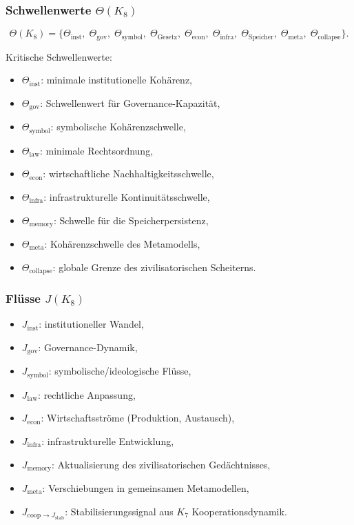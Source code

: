 \subsubsection{Schwellenwerte \texorpdfstring{$\Theta(K_8)$}{\Theta(K_8)}}

\[
\Theta(K_8)=
\{
\Theta_{\mathrm{inst}},\;
\Theta_{\mathrm{gov}},\;
\Theta_{\mathrm{symbol}},\;
\Theta_{\mathrm{Gesetz}},\;
\Theta_{\mathrm{econ}},\;
\Theta_{\mathrm{infra}},\;
\Theta_{\mathrm{Speicher}},\;
\Theta_{\mathrm{meta}},\;
\Theta_{\mathrm{collapse}}
\}.
\]

Kritische Schwellenwerte:
\begin{itemize}
    \item $\Theta_{\mathrm{inst}}$: minimale institutionelle Kohärenz,
    \item $\Theta_{\mathrm{gov}}$: Schwellenwert für Governance-Kapazität,
    \item $\Theta_{\mathrm{symbol}}$: symbolische Kohärenzschwelle,
    \item $\Theta_{\mathrm{law}}$: minimale Rechtsordnung,
    \item $\Theta_{\mathrm{econ}}$: wirtschaftliche Nachhaltigkeitsschwelle,
    \item $\Theta_{\mathrm{infra}}$: infrastrukturelle Kontinuitätsschwelle,
    \item $\Theta_{\mathrm{memory}}$: Schwelle für die Speicherpersistenz,
    \item $\Theta_{\mathrm{meta}}$: Kohärenzschwelle des Metamodells,
    \item $\Theta_{\mathrm{collapse}}$: globale Grenze des zivilisatorischen Scheiterns.
\end{itemize}

\subsubsection{Flüsse \texorpdfstring{$J(K_8)$}{J(K_8)}}

\begin{itemize}
    \item $J_{\mathrm{inst}}$: institutioneller Wandel,
    \item $J_{\mathrm{gov}}$: Governance-Dynamik,
    \item $J_{\mathrm{symbol}}$: symbolische/ideologische Flüsse,
    \item $J_{\mathrm{law}}$: rechtliche Anpassung,
    \item $J_{\mathrm{econ}}$: Wirtschaftsströme (Produktion, Austausch),
    \item $J_{\mathrm{infra}}$: infrastrukturelle Entwicklung,
    \item $J_{\mathrm{memory}}$: Aktualisierung des zivilisatorischen Gedächtnisses,
    \item $J_{\mathrm{meta}}$: Verschiebungen in gemeinsamen Metamodellen,
    \item $J_{\mathrm{coop}\to J_{\mathrm{stab}}}$: Stabilisierungssignal aus $K_7$ Kooperationsdynamik.
\end{itemize}


